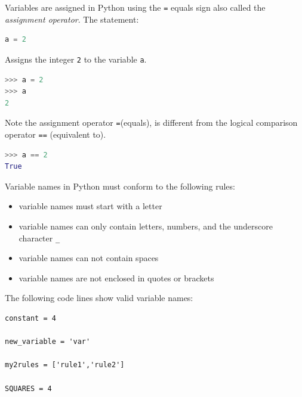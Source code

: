 \documentclass{book}
\providecommand{\tightlist}{%
      \setlength{\itemsep}{0pt}\setlength{\parskip}{0pt}}
\begin{document}
    
        Variables are assigned in Python using the \lstinline!=! equals sign
also called the \emph{assignment operator}. The statement:

\begin{lstlisting}[language=Python]
a = 2
\end{lstlisting}

Assigns the integer \lstinline!2! to the variable \lstinline!a!.
    




    
        \begin{lstlisting}[language=Python]
>>> a = 2
>>> a
2
\end{lstlisting}
    




    
        Note the assignment operator \lstinline!=!(equals), is different from
the logical comparison operator \lstinline!==! (equivalent to).
    




    
        \begin{lstlisting}[language=Python]
>>> a == 2
True
\end{lstlisting}
    




    
        Variable names in Python must conform to the following rules:

\begin{itemize}
\tightlist
\item
  variable names must start with a letter
\item
  variable names can only contain letters, numbers, and the underscore
  character \lstinline!_!
\item
  variable names can not contain spaces
\item
  variable names are not enclosed in quotes or brackets
\end{itemize}
    




    
        The following code lines show valid variable names:
    




    
        \begin{lstlisting}
constant = 4

new_variable = 'var'

my2rules = ['rule1','rule2']

SQUARES = 4
\end{lstlisting}
    
\end{document}
